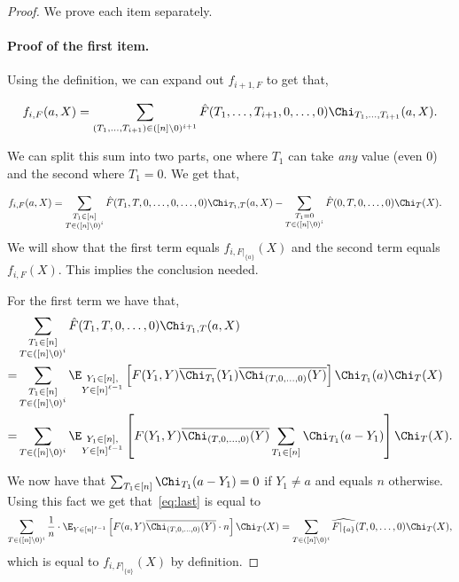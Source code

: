 \begin{proof}
We prove each item separately.
\paragraph{Proof of the first item.}
Using the definition, we can expand out $f_{i+1,F}$ to get that,

\[f_{i,F}(a, X) = \sum_{(T_1,\ldots,T_{i+1}) \in ([n] \setminus 0)^{i+1}}\hat{F}(T_1,\ldots,T_{i+1},0,\ldots, 0)\Chi_{T_1,\ldots,T_{i+1}}(a, X).\]

We can split this sum into two parts, one where $T_{1}$ can take \emph{any} value (even $0$) and the 
second where $T_{1} = 0$. We get that,

\begin{align*}
f_{i,F}(a,X) &= \sum_{ \substack{T_1 \in [n] \\ T \in ([n] \setminus 0)^i}}\hat{F}(T_1,T, 0,\ldots,0,\ldots, 0)\Chi_{T_1,T}(a,X) 
- \sum_{ \substack{T_1 = 0 \\ T \in ([n] \setminus 0)^i}}\hat{F}(0, T ,0,\ldots, 0)\Chi_{T}(X).
\end{align*}
We will show that the first term equals $f_{i, F|_{\{a\}}}(X)$ and the second term equals $f_{i,F}(X)$. This implies the conclusion needed.

For the first term we have that, 
\begin{align}
&\sum_{ \substack{T_1 \in [n] \\ T \in ([n] \setminus 0)^i}}\hat{F}(T_1, T,0,\ldots,0)\Chi_{T_1,T}(a, X) \nonumber \\
= &\sum_{ \substack{T_1 \in [n] \\ T \in ([n] \setminus 0)^i}} \E_{\substack{Y_1 \in [n], \\ Y \in [n]^{\ell - 1}}}\left[F(Y_1,Y)\overline{\Chi_{T_1}}(Y_1)\overline{\Chi_{(T,0,\ldots,0)}(Y)}\right]\Chi_{T_1}(a)\Chi_{T}(X) \nonumber \\
= &\sum_{T \in ([n] \setminus 0)^i} \E_{\substack{Y_1 \in [n], \\ Y \in [n]^{\ell - 1}}}\left[F(Y_1,Y)\overline{\Chi_{(T,0,\ldots,0)}(Y)}\sum_{T_1 \in [n]}\Chi_{T_1}(a-Y_1)\right]\Chi_{T}(X). \label{eq:last}
\end{align}

We now have that $\sum_{T_1 \in [n]}\Chi_{T_1}(a-Y_1) = 0$ if $Y_1 \neq a$ and equals $n$ otherwise. Using this fact we get that~\eqref{eq:last} is equal to
\begin{align*}
\sum_{T \in ([n] \setminus 0)^i} \frac{1}{n} \cdot \E_{Y \in [n]^{\ell - 1}}\left[F(a,Y)\overline{\Chi_{(T,0,\ldots,0)}(Y)}\cdot n\right]\Chi_{T}(X) 
= \sum_{T \in ([n] \setminus 0)^i} \widehat{F|_{\{a\}}}(T,0,\ldots,0)\Chi_{T}(X),
\end{align*}
which is equal to $f_{i, F|_{\{a\}}}(X)$ by definition.



\end{proof}

